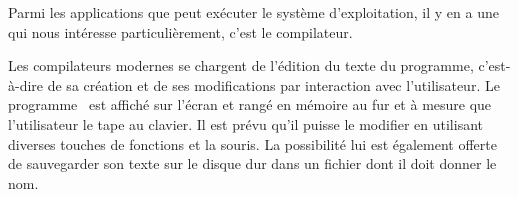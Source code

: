 {\begin{minipage}{\myparboxwidth}
Parmi les applications que peut exécuter le système d'exploitation, 
il y en a une qui nous intéresse particulièrement, c'est le compilateur.

Les compilateurs modernes se chargent de l'édition du texte du
programme, c'est-à-dire de sa création et de ses modifications
par interaction avec l'utilisateur. Le 
programme \ocaml\ est affiché sur l'écran et rangé en mémoire 
au fur et à mesure que
l'utilisateur le tape au clavier. Il est prévu qu'il puisse le modifier
en utilisant diverses touches de fonctions et la souris. La possibilité
lui est également offerte de sauvegarder son texte sur le disque dur
dans un fichier dont il doit donner le nom.

\vspace{\abovedisplayskip}
\end{minipage}
}

